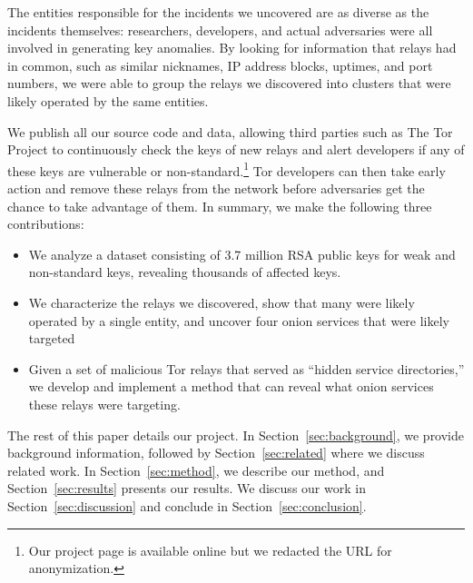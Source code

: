 The entities responsible for the incidents we uncovered are as diverse as the
incidents themselves: researchers, developers, and actual adversaries were all
involved in generating key anomalies.  By looking for information that relays
had in common, such as similar nicknames, IP address blocks, uptimes, and port
numbers, we were able to group the relays we discovered into clusters that were
likely operated by the same entities.

We publish all our source code and data, allowing third parties such as The Tor
Project to continuously check the keys of new relays and alert developers if
any of these keys are vulnerable or non-standard.\footnote{Our project page is
available online but we redacted the URL for anonymization.}  Tor
developers can then take early action and remove these relays from the network
before adversaries get the chance to take advantage of them.  In summary, we
make the following three contributions:
\begin{itemize}
	\item We analyze a dataset consisting of 3.7 million RSA public keys for
		weak and non-standard keys, revealing thousands of affected keys.

	\item We characterize the relays we discovered, show that many were
		likely operated by a single entity, and uncover four onion services that
		were likely targeted

	\item Given a set of malicious Tor relays that served as ``hidden service
		directories,'' we develop and implement a method that can reveal what
		onion services these relays were targeting.
\end{itemize}

The rest of this paper details our project.  In Section~\ref{sec:background}, we
provide background information, followed by Section~\ref{sec:related} where we 
discuss related work.  In Section~\ref{sec:method}, we describe our method,
and Section~\ref{sec:results} presents our results.  We discuss our work in
Section~\ref{sec:discussion} and conclude in Section~\ref{sec:conclusion}.
